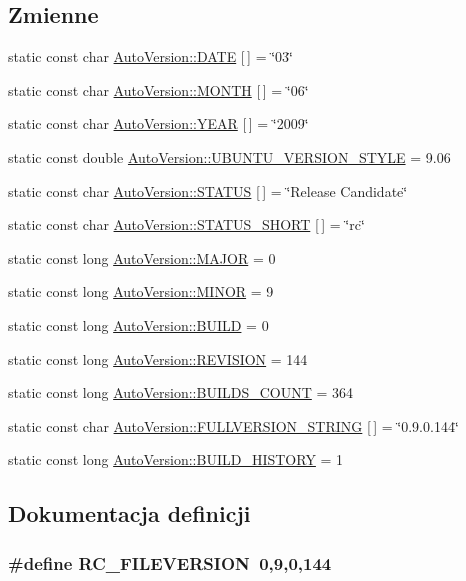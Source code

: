 \subsection*{Zmienne}
\begin{CompactItemize}
\item 
static const char \hyperlink{a00019_76114a4076f4ae162ea5de4f97d1a597}{AutoVersion::DATE} \mbox{[}$\,$\mbox{]} = \char`\"{}03\char`\"{}
\item 
static const char \hyperlink{a00019_c5504cfe250e5b6e09bde81a917c4349}{AutoVersion::MONTH} \mbox{[}$\,$\mbox{]} = \char`\"{}06\char`\"{}
\item 
static const char \hyperlink{a00019_c6726fe1f27cfa5f70c5eb624c6095fc}{AutoVersion::YEAR} \mbox{[}$\,$\mbox{]} = \char`\"{}2009\char`\"{}
\item 
static const double \hyperlink{a00019_06157f622b974a3180a91ffa5e4fc200}{AutoVersion::UBUNTU\_\-VERSION\_\-STYLE} = 9.06
\item 
static const char \hyperlink{a00019_cb58e6df1058868fe3e780122ab30ef1}{AutoVersion::STATUS} \mbox{[}$\,$\mbox{]} = \char`\"{}Release Candidate\char`\"{}
\item 
static const char \hyperlink{a00019_dc0aeb82b23e4fa3a91bc1f4d2ab0aed}{AutoVersion::STATUS\_\-SHORT} \mbox{[}$\,$\mbox{]} = \char`\"{}rc\char`\"{}
\item 
static const long \hyperlink{a00019_85ad69390168fa80a3868ae22631b48c}{AutoVersion::MAJOR} = 0
\item 
static const long \hyperlink{a00019_2c324b304c1d4c4d273f848c50679eb4}{AutoVersion::MINOR} = 9
\item 
static const long \hyperlink{a00019_611dbb96b2f949b29627d8d714396911}{AutoVersion::BUILD} = 0
\item 
static const long \hyperlink{a00019_e2d1fcdc67a4319c421677ebe1ef4d09}{AutoVersion::REVISION} = 144
\item 
static const long \hyperlink{a00019_03e819549a8f22b45aacef6ac27de284}{AutoVersion::BUILDS\_\-COUNT} = 364
\item 
static const char \hyperlink{a00019_2c666a4ee8f49f7647b06e6c526858ad}{AutoVersion::FULLVERSION\_\-STRING} \mbox{[}$\,$\mbox{]} = \char`\"{}0.9.0.144\char`\"{}
\item 
static const long \hyperlink{a00019_cc483b25abe55f62bcf02496baf549dc}{AutoVersion::BUILD\_\-HISTORY} = 1
\end{CompactItemize}


\subsection{Dokumentacja definicji}
\hypertarget{a00017_0e86d046ea87587e402d375c6b0927c6}{
\subsubsection[{RC\_\-FILEVERSION}]{\setlength{\rightskip}{0pt plus 5cm}\#define RC\_\-FILEVERSION~0,9,0,144}}
\label{d4/d51/a00017_0e86d046ea87587e402d375c6b0927c6}





